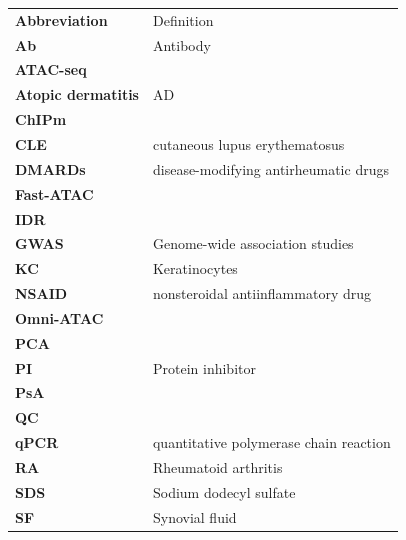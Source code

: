 \begin{table}[H]
\singlespacing
  \centering
   \begin{tabular}{@{}m{2.5cm}m{10cm}@{}}
	  \textbf{Abbreviation} & Definition \\
		\textbf{Ab} & Antibody\\
		\textbf{ATAC-seq} & \\
		\textbf{Atopic dermatitis} & AD \\
		\textbf{ChIPm} &  \\
		\textbf{CLE} & cutaneous lupus erythematosus \\
		\textbf{DMARDs} & disease-modifying antirheumatic drugs \\
		\textbf{Fast-ATAC} & \\
		\textbf{IDR} & \\
		\textbf{GWAS} & Genome-wide association studies\\
		\textbf{KC} & Keratinocytes \\
		\textbf{NSAID} & nonsteroidal antiinflammatory drug \\
		\textbf{Omni-ATAC} & \\
		\textbf{PCA} & \\
		\textbf{PI} & Protein inhibitor \\
		\textbf{PsA} &  \\
		\textbf{QC} & \\
		\textbf{qPCR} & quantitative polymerase chain reaction \\
		\textbf{RA} & Rheumatoid arthritis \\
		\textbf{SDS} & Sodium dodecyl sulfate \\
		\textbf{SF} & Synovial fluid\\
    \end{tabular}%
\end{table}%
%
